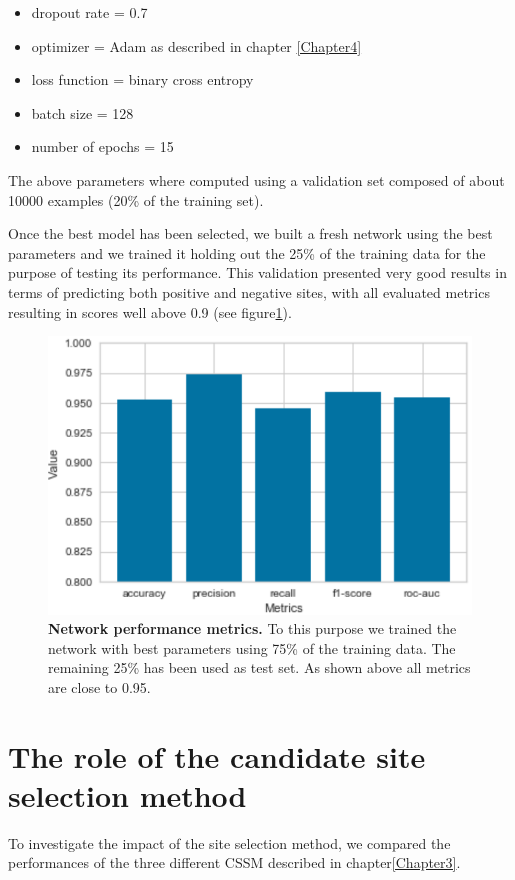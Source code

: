 \begin{itemize}
	\item dropout rate = 0.7
	\item optimizer = Adam as described in chapter \ref{Chapter4}
	\item loss function = binary cross entropy
	\item batch size = 128
	\item number of epochs = 15
\end{itemize}

The above parameters where computed using a validation set composed of about 10000 examples (20\% of the training set).

Once the best model has been selected, we built a fresh network using the best parameters and we trained it holding out the 25\% of the training data for the purpose of testing its performance. This validation presented very good results in terms of predicting both positive and negative sites, with all evaluated metrics resulting in scores well above 0.9 (see figure\ref{fig:network_evaluation}).

\begin{figure}[hbt!]
	\centering
	\includegraphics[width=\textwidth]{Figures/network_evaluation}
	\caption{\textbf{Network performance metrics.} To this purpose we trained the network with best parameters using 75\% of the training data. The remaining 25\% has been used as test set. As shown above all metrics are close to 0.95.}
	\label{fig:network_evaluation}
\end{figure}

\section{The role of the candidate site selection method}
To investigate the impact of the site selection method, we compared the performances of the three different CSSM described in chapter\ref{Chapter3}. 

